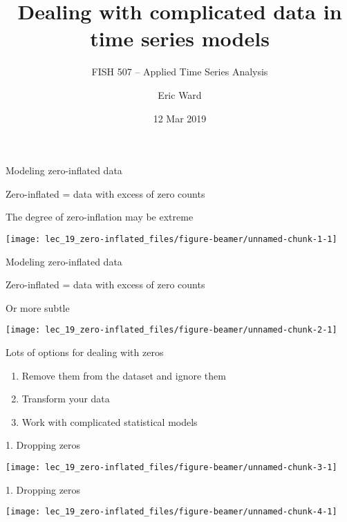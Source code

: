 \documentclass[ignorenonframetext,]{beamer}
\title{Dealing with complicated data in time series models}
\subtitle{FISH 507 -- Applied Time Series Analysis}
\author{Eric Ward}
\date{12 Mar 2019}
\begin{document}
\frame{\titlepage}

\begin{frame}{Modeling zero-inflated data}

Zero-inflated = data with excess of zero counts

The degree of zero-inflation may be extreme

\begin{center}\texttt{[image: lec\_19\_zero-inflated\_files/figure-beamer/unnamed-chunk-1-1]} \end{center}

\end{frame}

\begin{frame}{Modeling zero-inflated data}

Zero-inflated = data with excess of zero counts

Or more subtle

\begin{center}\texttt{[image: lec\_19\_zero-inflated\_files/figure-beamer/unnamed-chunk-2-1]} \end{center}

\end{frame}

\begin{frame}{Lots of options for dealing with zeros}

\begin{enumerate}
\def\labelenumi{\arabic{enumi}.}
\item
  Remove them from the dataset and ignore them
\item
  Transform your data
\item
  Work with complicated statistical models
\end{enumerate}

\end{frame}

\begin{frame}{1. Dropping zeros}

\begin{center}\texttt{[image: lec\_19\_zero-inflated\_files/figure-beamer/unnamed-chunk-3-1]} \end{center}

\end{frame}

\begin{frame}{1. Dropping zeros}

\begin{center}\texttt{[image: lec\_19\_zero-inflated\_files/figure-beamer/unnamed-chunk-4-1]} \end{center}

\end{frame}
\end{document}

